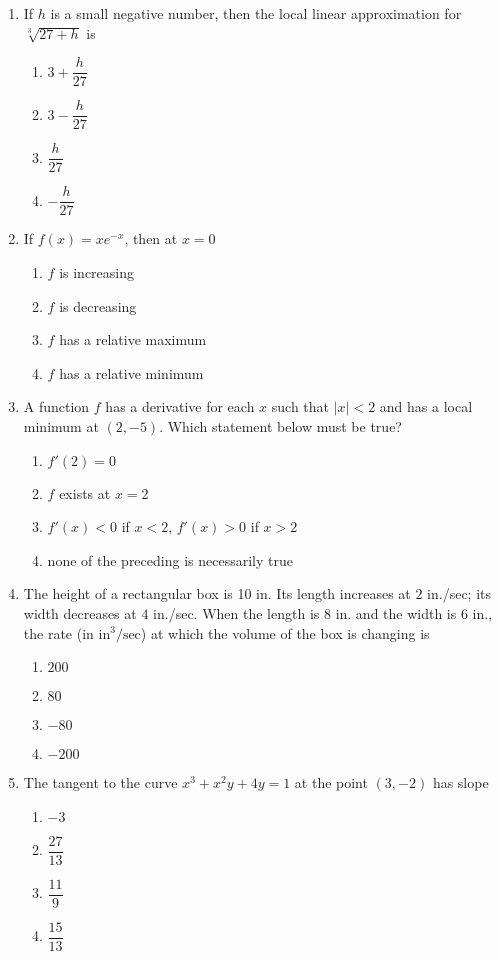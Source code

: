 \documentclass[12pt]{article}
\begin{document}
\begin{enumerate}[label=\textbf{A\arabic*.},resume]
\item If $h$ is a small negative number, then the local linear approximation for $\sqrt[3]{27+h}$ is
\begin{enumerate}[label=(\Alph*)]
\item $3+\dfrac{h}{27}$ \item $3-\dfrac{h}{27}$ \item $\dfrac{h}{27}$ \item $-\dfrac{h}{27}$
\end{enumerate}

\item If $f(x)=xe^{-x}$, then at $x=0$
\begin{enumerate}[label=(\Alph*)]
\item $f$ is increasing \item $f$ is decreasing \item $f$ has a relative maximum \item $f$ has a relative minimum
\end{enumerate}

\item A function $f$ has a derivative for each $x$ such that $|x|<2$ and has a local minimum at $(2,-5)$. Which statement below must be true?
\begin{enumerate}[label=(\Alph*)]
\item $f'(2)=0$ \item $f$ exists at $x=2$ \item $f'(x)<0$ if $x<2$, $f'(x)>0$ if $x>2$ \item none of the preceding is necessarily true
\end{enumerate}

\item The height of a rectangular box is 10 in. Its length increases at $2$ in./sec; its width decreases at $4$ in./sec. When the length is $8$ in. and the width is $6$ in., the rate (in $\text{in}^{3}/\text{sec}$) at which the volume of the box is changing is
\begin{enumerate}[label=(\Alph*)]
\item $200$ \item $80$ \item $-80$ \item $-200$
\end{enumerate}

\item The tangent to the curve $x^{3}+x^{2}y+4y=1$ at the point $(3,-2)$ has slope
\begin{enumerate}[label=(\Alph*)]
\item $-3$ \item $\dfrac{27}{13}$ \item $\dfrac{11}{9}$ \item $\dfrac{15}{13}$
\end{enumerate}


\end{enumerate}
\end{document}
